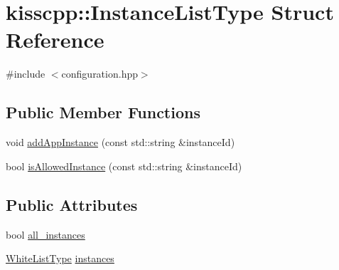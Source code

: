 \hypertarget{structkisscpp_1_1_instance_list_type}{\section{kisscpp\-:\-:Instance\-List\-Type Struct Reference}
\label{structkisscpp_1_1_instance_list_type}
}


{\ttfamily \#include $<$configuration.\-hpp$>$}

\subsection*{Public Member Functions}
\begin{DoxyCompactItemize}
\item 
void \hyperlink{structkisscpp_1_1_instance_list_type_a7040d7a8d1bb673d1e5d9de241fdd1b0}{add\-App\-Instance} (const std\-::string \&instance\-Id)
\item 
bool \hyperlink{structkisscpp_1_1_instance_list_type_add939d7a7d3ea4e6218435fbae1bd0ea}{is\-Allowed\-Instance} (const std\-::string \&instance\-Id)
\end{DoxyCompactItemize}
\subsection*{Public Attributes}
\begin{DoxyCompactItemize}
\item 
bool \hyperlink{structkisscpp_1_1_instance_list_type_a369b1be877ef96e3b30fbc5e7c1fb429}{all\-\_\-instances}
\item 
\hyperlink{namespacekisscpp_a6aa00ccbe46e3a892fa90d3fbf6e3439}{White\-List\-Type} \hyperlink{structkisscpp_1_1_instance_list_type_ab41a6811d252741bb3000bc13733e19b}{instances}
\end{DoxyCompactItemize}


